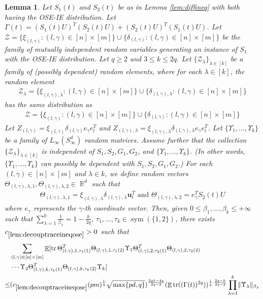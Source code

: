 \documentclass[11pt]{amsart}
\numberwithin{equation}{section}
\numberwithin{equation}{section}
\DeclareMathOperator{\E}{\mathbb{E}}
\DeclareMathOperator{\R}{\mathbb{R}}
\DeclareMathOperator*{\tr}{tr}
\DeclareMathOperator{\sym}{sym}
\DeclarePairedDelimiter{\norm}{\lVert}{\rVert}
\newtheorem{lemma}[theorem]{Lemma}
\theoremstyle{remark}
\theoremstyle{definition}
\begin{document}
\begin{lemma} \label{lem:decouptraceineqose}
    Let $S_1(t)$ and $S_2(t)$ be as in Lemma \ref{lem:diffineq} with both having the OSE-IE distribution. Let $\Gamma(t)=(S_1(t)U)^T(S_2(t)U)+(S_2(t)U)^T(S_1(t)U)$. Let $\mathcal{Z}=\{\xi_{(l,\gamma)}:(l,\gamma) \in [n] \times [m]\} \cup \{\delta_{(l,\gamma)}:(l,\gamma) \in [n] \times [m]\}$ be the family of mutually independent random variables generating an instance of $S_1$ with the OSE-IE distribution. Let $q \ge 2$ and $3 \le k \le 2q$. Let $\{\mathcal{Z}_{\lambda}\}_{\lambda \in [k]}$ be a family of (possibly dependent) random elements, where for each $\lambda \in [k]$, the random element
\begin{align*}
    \mathcal{Z}_{\lambda}=\{\xi_{(l,\gamma),\lambda}:(l,\gamma) \in [n] \times [m]\} \cup \{\delta_{(l,\gamma),\lambda}:(l,\gamma) \in [n] \times [m]\}
\end{align*}
has the same distribution as 
\begin{align*}
    \mathcal{Z}=\{\xi_{(l,\gamma)}:(l,\gamma) \in [n] \times [m]\} \cup \{\delta_{(l,\gamma)}:(l,\gamma) \in [n] \times [m]\}
\end{align*}
Let $Z_{(l,\gamma)}=\xi_{(l,\gamma)} \delta_{(l,\gamma)} e_{\gamma} e_l^T$ and $Z_{(l,\gamma),\lambda}= \xi_{(l,\gamma), \lambda} \delta_{(l,\gamma), \lambda} e_{\gamma} e_l^T$.
Let $\{\Upsilon_1,...,\Upsilon_k\}$ be a family of $L_{\infty}(S_{\infty}^d)$ random matrices.
Assume further that the collection $\{\mathcal{Z}_{\lambda}\}_{\lambda \in [k]}$ is independent of $S_1, S_2, G_1, G_2$, and $\{\Upsilon_1,...,\Upsilon_k\}$. (In other words, $\{\Upsilon_1,...,\Upsilon_k\}$ can possibly be dependent with $S_1, S_2, G_1, G_2$.)
For each $(l,\gamma) \in [n] \times [m]$ and $\lambda \in k$, we define random vectors $\Theta_{(l,\gamma), \lambda, 1}, \Theta_{(l,\gamma), \lambda, 2} \in \R^d$ such that
\begin{align*}
    \Theta_{(l,\gamma), \lambda, 1} = \xi_{(l,\gamma),\lambda} \delta_{(l,\gamma), \lambda} \mathbf{u}_l^T \text{ and } \Theta_{(l,\gamma), \lambda, 2} = e_{\gamma}^TS_2(t)U
\end{align*}
where $e_{\gamma}$ represents the $\gamma$-th coordinate vector. Then, given $0 \le \beta_1,...,\beta_k \le +\infty$ such that $\sum \limits_{\lambda=1}^k \frac{1}{\beta_{\lambda}}=1-\frac{k}{2q}$, $\tau_1, \ldots, \tau_k \in \sym(\{1,2 \})$, there exists $c_{\ref*{lem:decouptraceineqose}}>0$ such that
\begin{align*}
    &\sum_{(l,\gamma) \in [n] \times [m]} \E[ \tr \Theta_{(l,\gamma), 1, \tau_1(1)}^T\Theta_{(l,\gamma), 1, \tau_1(2)}
	\Upsilon_1\Theta_{(l,\gamma), 2, \tau_2(1)}^T\Theta_{(l,\gamma), 2, \tau_2(2)} \\&\cdots
	\Upsilon_2\Theta_{(l,\gamma), k, \tau_k(1)}^T\Theta_{(l,\gamma), k, \tau_k(2)}\Upsilon_k]  \\ \le &
       (c_{\ref*{lem:decouptraceineqose}}(pm)^\frac{1}{q}\sqrt{\max\{pd,q\}})^{\frac{2qk-4q}{2q-2}} (\E \tr((\Gamma(t))^{2q}))^{\frac{1}{q} \cdot \frac{2q-k}{2q-2}} \prod \limits_{\lambda=1}^k \norm{\Upsilon_{\lambda}}_{\beta_{\lambda}}
\end{align*}
\end{lemma}
\end{document}
